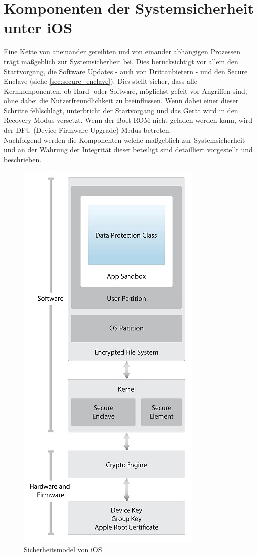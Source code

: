 \section{Komponenten der Systemsicherheit unter
iOS}\label{sec:components-syssec} Eine Kette von aneinander gereihten und
von einander abhängigen Prozessen trägt maßgeblich zur Systemsicherheit bei. Dies berücksichtigt vor allem den
	Startvorgang, die Software Updates - auch von Drittanbietern - und den Secure
	Enclave (siehe \ref{sec:secure_enclave}). Dies stellt sicher, dass alle
	Kernkomponenten, ob Hard- oder Software, möglichst gefeit vor Angriffen sind, ohne dabei die
	Nutzerfreundlichkeit zu beeinflussen. Wenn dabei einer dieser Schritte
	fehlschlägt, unterbricht der Startvorgang und das Gerät wird in den
	Recovery Modus versetzt. Wenn der Boot-ROM nicht geladen werden kann, wird der DFU (Device
	Firmware Upgrade) Modus betreten.\\ 
	Nachfolgend werden die Komponenten welche maßgeblich zur Systemsicherheit und
	an der Wahrung der Integrität dieser beteiligt sind	detailliert vorgestellt und beschrieben.
	
	\begin{figure}[h]
		\centering
		\includegraphics[width=0.4\linewidth]{ios/media/security-model.jpg}
		\caption{Sicherheitsmodel von iOS \cite[S.4]{iOSSecurityApr2015}}
		\label{fig:security-model}
	\end{figure}

